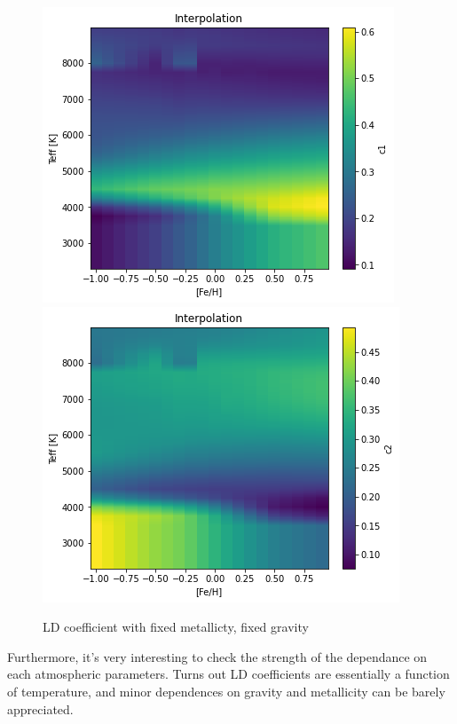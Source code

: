 \documentclass[a4paper,11pt,twocolumn]{article}
\begin{document}
\begin{figure}[H]
    \includegraphics[scale=0.25, angle=0]{../pictures/Claret2017/2017_c1_fixedg}
    \includegraphics[scale=0.25, angle=0]{../pictures/Claret2017/2017_c2_fixedg}
    \caption{LD coefficient with fixed metallicty, fixed gravity}
\end{figure}
Furthermore, it's very interesting to check the strength of the dependance 
on each atmospheric parameters. Turns out LD coefficients are essentially a 
function of temperature, and minor dependences on gravity and metallicity 
can be barely appreciated.
\end{document}
